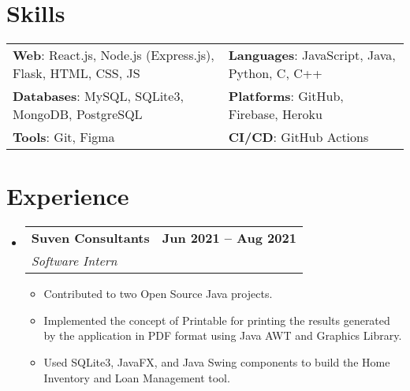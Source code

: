 \documentclass[letterpaper,11pt]{article}
\makeatletter
\newcommand{\resumeItem}[1]{
  \item\small{
    {#1 \vspace{-2pt}}
  }
}
\newcommand{\resumeSubheading}[4]{
  \vspace{-2pt}\item
    \begin{tabular*}{1.0\textwidth}[t]{l@{\extracolsep{\fill}}r}
      \vspace{-2pt}\textbf{#1} & \textbf{\small #2} \\
      \textit{\small#3} & \textit{\small #4} \\
    \end{tabular*}\vspace{-7pt}
}
\newcommand{\resumeSubHeadingListStart}{\begin{itemize}[leftmargin=0.0in, label={}]}
\newcommand{\resumeSubHeadingListEnd}{\end{itemize}}
\newcommand{\resumeItemListStart}{\begin{itemize}}
\newcommand{\resumeItemListEnd}{\end{itemize}\vspace{-5pt}}
\makeatother
\begin{document}
\section{Skills}
    \vspace{-4pt}
    \begin{itemize}[leftmargin=0.2in, label={}]
        {\item{
            \begin{tabular}{ l@{\hskip 0.2in} l }
                 \textbf{Web}: React.js, Node.js (Express.js), Flask, HTML, CSS, JS & \textbf{Languages}: JavaScript, Java, Python, C, C++ \\ 
                 \textbf{Databases}: MySQL, SQLite3, MongoDB, PostgreSQL & \textbf{Platforms}: GitHub, Firebase, Heroku \\  
                 \textbf{Tools}: Git, Figma & \textbf{CI/CD}: GitHub Actions
            \end{tabular}
        }}
    \end{itemize}
\vspace{-20pt}


\section{Experience}
    \vspace{-2pt}
    \resumeSubHeadingListStart
        \resumeSubheading
            {Suven Consultants}{Jun 2021 -- Aug 2021}
            {Software Intern}{}
            \resumeItemListStart
                \resumeItem{Contributed to two Open Source Java projects.}
                \resumeItem{Implemented the concept of Printable for printing the results generated by the application in PDF format using Java AWT and Graphics Library.}
                \resumeItem{Used SQLite3, JavaFX, and Java Swing components to build the Home Inventory and Loan Management tool.}
            \resumeItemListEnd
        \vspace{-3pt}
    \resumeSubHeadingListEnd
\vspace{-15pt}


\end{document}
